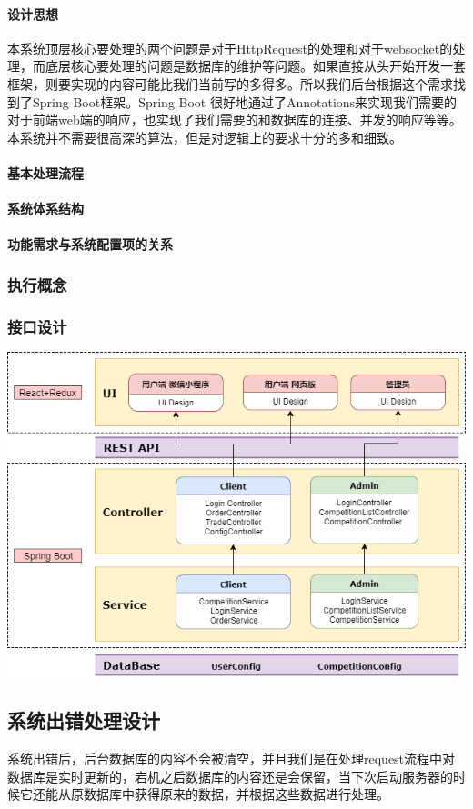\documentclass{article}
\begin{document}
\paragraph{设计思想}
	本系统顶层核心要处理的两个问题是对于HttpRequest的处理和对于websocket的处理，而底层核心要处理的问题是数据库的维护等问题。如果直接从头开始开发一套框架，则要实现的内容可能比我们当前写的多得多。所以我们后台根据这个需求找到了Spring Boot框架。Spring Boot 很好地通过了Annotations来实现我们需要的对于前端web端的响应，也实现了我们需要的和数据库的连接、并发的响应等等。本系统并不需要很高深的算法，但是对逻辑上的要求十分的多和细致。
\paragraph{基本处理流程}
\paragraph{系统体系结构}
\paragraph{功能需求与系统配置项的关系}
\subsubsection{执行概念}
\subsubsection{接口设计}
\includegraphics[scale = .3]{架构图.png}
\subsection{系统出错处理设计}
系统出错后，后台数据库的内容不会被清空，并且我们是在处理request流程中对数据库是实时更新的，宕机之后数据库的内容还是会保留，当下次启动服务器的时候它还能从原数据库中获得原来的数据，并根据这些数据进行处理。
\end{document}
